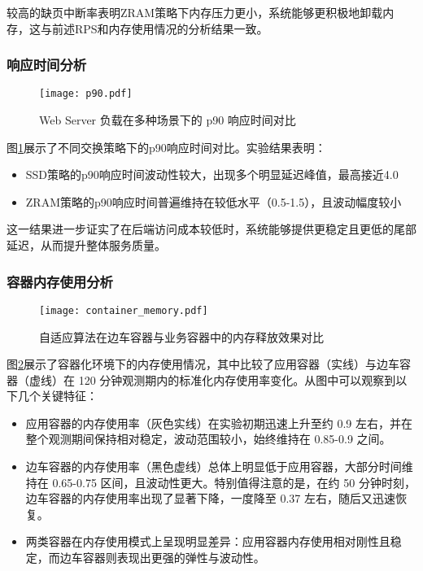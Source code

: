 较高的缺页中断率表明ZRAM策略下内存压力更小，系统能够更积极地卸载内存，这与前述RPS和内存使用情况的分析结果一致。

\subsubsection{响应时间分析}
\begin{figure}[htb]
    \centering
    \texttt{[image: p90.pdf]}
    \caption{Web Server 负载在多种场景下的 p90 响应时间对比}
    \label{fig:p90}
\end{figure}
图\ref{fig:p90}展示了不同交换策略下的p90响应时间对比。实验结果表明：
\begin{itemize}
    \item SSD策略的p90响应时间波动性较大，出现多个明显延迟峰值，最高接近4.0
    \item ZRAM策略的p90响应时间普遍维持在较低水平（0.5-1.5），且波动幅度较小
\end{itemize}

这一结果进一步证实了在后端访问成本较低时，系统能够提供更稳定且更低的尾部延迟，从而提升整体服务质量。

\subsubsection{容器内存使用分析}
\begin{figure}[htbp]
    \centering
    \texttt{[image: container\_memory.pdf]}
    \caption{自适应算法在边车容器与业务容器中的内存释放效果对比}
    \label{fig:container_memory}
\end{figure}
图\ref{fig:container_memory}展示了容器化环境下的内存使用情况，其中比较了应用容器（实线）与边车容器（虚线）在 120 分钟观测期内的标准化内存使用率变化。从图中可以观察到以下几个关键特征：
\begin{itemize}
    \item 应用容器的内存使用率（灰色实线）在实验初期迅速上升至约 0.9 左右，并在整个观测期间保持相对稳定，波动范围较小，始终维持在 0.85-0.9 之间。
    \item 边车容器的内存使用率（黑色虚线）总体上明显低于应用容器，大部分时间维持在 0.65-0.75 区间，且波动性更大。特别值得注意的是，在约 50 分钟时刻，边车容器的内存使用率出现了显著下降，一度降至 0.37 左右，随后又迅速恢复。
    \item 两类容器在内存使用模式上呈现明显差异：应用容器内存使用相对刚性且稳定，而边车容器则表现出更强的弹性与波动性。
\end{itemize}

